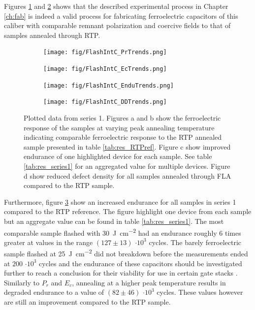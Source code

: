 \documentclass[11pt,twoside,final]{eitExjobb}  %
\begin{document}
Figures \ref{fig:res_IntCPr} and \ref{fig:res_IntCEc} shows that the
described experimental process in Chapter \ref{ch:fab} is indeed a valid process for
fabricating ferroelectric capacitors of this caliber with comparable remnant
polarization and coercive fields to that of samples annealed through RTP.

\begin{figure}[htbp]
    \centering
    \begin{subfigure}{.4\linewidth}
        \texttt{[image: fig/FlashIntC\_PrTrends.png]}
        \caption{}\label{fig:res_IntCPr}
    \end{subfigure}
    \begin{subfigure}{.4\linewidth}
        \texttt{[image: fig/FlashIntC\_EcTrends.png]}
        \caption{}\label{fig:res_IntCEc}
    \end{subfigure}
    \begin{subfigure}{.4\linewidth}
        \texttt{[image: fig/FlashIntC\_EnduTrends.png]}
        \caption{}\label{fig:res_IntCEndu}
    \end{subfigure}
    \begin{subfigure}{.4\linewidth}
        \texttt{[image: fig/FlashIntC\_DDTrends.png]}
        \caption{}\label{fig:res_IntCDD}
    \end{subfigure}
    \caption{Plotted data from series 1. Figures a and
        b show the ferroelectric response of the samples at varying peak
        annealing temperature indicating comparable ferroelectric response to
        the RTP annealed sample presented in table \ref{tab:res_RTPref}.
        Figure c show improved endurance of one highlighted device for each
        sample. See table \ref{tab:res_series1} for an aggregated value for
        multiple devices. Figure d show reduced defect density for all samples
        annealed through FLA compared to the RTP sample.}\label{fig:res_IntC}
\end{figure}

Furthermore, figure \ref{fig:res_IntCEndu} show an increased endurance for all
samples in series 1 compared to the RTP reference. The figure highlight one
device from each sample but an aggregate value can be found in table
\ref{tab:res_series1}. The most comparable sample flashed
with \SI{30}{\joule\per\centi\meter\squared} had an endurance roughly 6 times
greater at values in the range $(127 \pm 13)$ $\cdot 10^3$ cycles. The barely
ferroelectric sample flashed at \SI{25}{\joule\per\centi\meter\squared}
did not breakdown before the measurements ended at $200$ $\cdot 10^3$ cycles and
the endurance of these capacitors should be investigated further to reach a
conclusion for their viability for use in certain gate stacks \cite{dawber2005physics}.
Similarly to $P_r$ and $E_c$, annealing at a higher peak temperature results in degraded
endurance to a value of $(82 \pm 46)$ $\cdot 10^3$ cycles. These values however
are still an improvement compared to the RTP sample.
\end{document}
